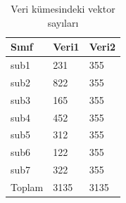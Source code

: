 \begin{table}
\centering
\caption{Veri kümesindeki vektor sayıları}\label{tab:smotetablo}
\begin{tabular}{|l|l|l|}
\hline
\textbf{Sınıf}   & \textbf{Veri1}   & \textbf{Veri2} \\ \hline
sub1      & 231    & 355      \\ \hline
sub2 & 822 & 355    \\ \hline
sub3 & 165 & 355    \\ \hline
sub4 & 452 & 355    \\ \hline
sub5 & 312 & 355    \\ \hline
sub6 & 122 & 355    \\ \hline
sub7 & 322 & 355    \\ \hline
Toplam & 3135 & 3135    \\ \hline
\end{tabular}
\end{table}

	
	
